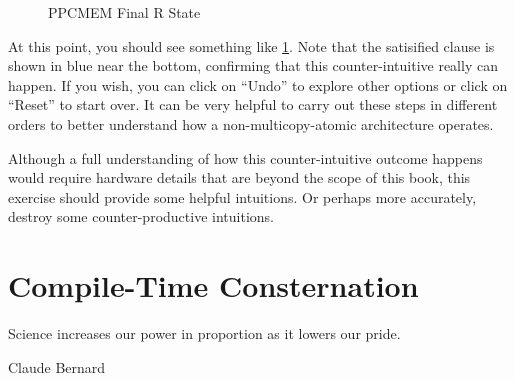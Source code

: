 \begin{figure}[tbp]
\centering
{}
\caption{PPCMEM Final R State}
\label{fig:memorder:PPCMEM Final R State}
\end{figure}

At this point, you should see something like
\cref{fig:memorder:PPCMEM Final R State}.
Note that the satisified  clause is shown in blue near the
bottom, confirming that this counter-intuitive really can happen.
If you wish, you can click on ``Undo'' to explore other options or
click on ``Reset'' to start over.
It can be very helpful to carry out these steps in different orders
to better understand how a non-multicopy-atomic architecture operates.

\QuickQuizEnd

Although a full understanding of how this counter-intuitive outcome
happens would require hardware details that are beyond the scope of
this book, this exercise should provide some helpful intuitions.
Or perhaps more accurately, destroy some counter-productive intuitions.


\section{Compile-Time Consternation}
\label{sec:memorder:Compile-Time Consternation}
%
\epigraph{Science increases our power in proportion as it lowers our pride.}
	 {Claude Bernard}


